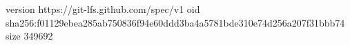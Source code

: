 version https://git-lfs.github.com/spec/v1
oid sha256:f01129ebea285ab750836f94e60ddd3ba4a5781bde310e74d256a207f31bbb74
size 349692
